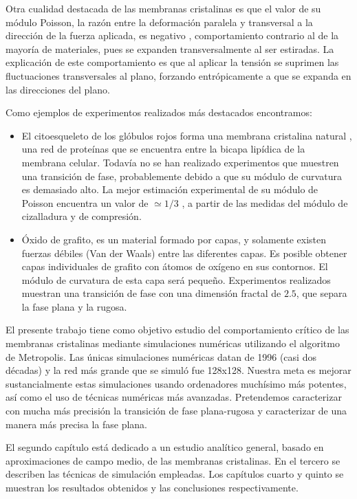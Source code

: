 Otra cualidad destacada de las membranas cristalinas es que el valor de su módulo Poisson,
la razón entre la deformación paralela y transversal a la dirección de 
la fuerza aplicada, es negativo \cite{Bowick_poisson_ratio}, comportamiento
contrario al de la mayoría de materiales, pues se expanden transversalmente al
ser estiradas. La explicación de este comportamiento es que al aplicar la
tensión se suprimen las fluctuaciones transversales al plano, forzando
entrópicamente a que se expanda en las direcciones del plano. 

Como ejemplos de experimentos realizados más destacados encontramos:
\begin{itemize}
\item El citoesqueleto de los glóbulos rojos forma una membrana cristalina
  natural \cite{Boal_MCell}, una red de proteínas que se encuentra entre la
  bicapa  lipídica de la membrana celular. Todavía no se han
  realizado experimentos que muestren una transición de fase, probablemente
  debido a que su módulo de curvatura es demasiado alto. La mejor estimación experimental de su
  módulo de Poisson encuentra un valor de $\simeq 1/3$ \cite{Discher:Molecular}, a partir de las
  medidas del módulo de cizalladura y de compresión.
\item Óxido de grafito, es un material formado por capas, y solamente existen
  fuerzas débiles (Van der Waals) entre las diferentes capas. Es posible
  obtener capas individuales de grafito con átomos de oxígeno en sus
  contornos. El módulo de curvatura de esta capa será pequeño. Experimentos
  realizados \cite{Hwa:Conformation} muestran una transición de fase con una dimensión fractal de
  $2.5$, que separa la fase plana y la rugosa.
\end{itemize}

El presente trabajo tiene como objetivo estudio del comportamiento crítico de
las membranas cristalinas mediante simulaciones numéricas utilizando el
algoritmo de Metropolis. Las únicas simulaciones numéricas datan de 1996 (casi
dos décadas) \cite{Bowick_flat_phase} y la red más grande que se simuló fue
128x128. Nuestra meta es mejorar sustancialmente estas simulaciones usando
ordenadores muchísimo más potentes, así como el uso de técnicas 
numéricas más avanzadas. Pretendemos caracterizar con mucha más precisión la
transición de fase plana-rugosa y caracterizar de una manera más precisa la
fase plana. 

El segundo capítulo está dedicado a un estudio analítico general, basado en
aproximaciones de campo medio, de las membranas
cristalinas. En el tercero se describen las técnicas de simulación
empleadas. Los capítulos cuarto y quinto se muestran los resultados obtenidos
y las conclusiones respectivamente.




  
